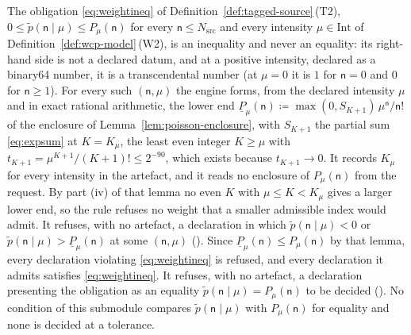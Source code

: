\begin{requirement}\label{req:sector-weight-bound}
The obligation \eqref{eq:weightineq} of Definition~\ref{def:tagged-source}\,(T2),
$0\le\tilde p(\mathsf{n}\mid\mu)\le P_\mu(\mathsf{n})$ for every
$\mathsf{n}\le N_{\mathrm{src}}$ and every intensity $\mu\in\mathrm{Int}$ of
Definition~\ref{def:wcp-model}\,(W2), is an inequality and never an equality:
its right-hand side is not a declared datum, and at a positive intensity,
declared as a binary64 number, it is a transcendental number (at $\mu=0$ it is
$1$ for $\mathsf{n}=0$ and $0$ for $\mathsf{n}\ge1$). For every such
$(\mathsf{n},\mu)$ the engine forms, from the declared intensity $\mu$ and in
exact rational arithmetic, the lower end
$\underline{P}_\mu(\mathsf{n})\coloneqq\max(0,S_{K+1})\,\mu^{\mathsf{n}}/\mathsf{n}!$
of the enclosure of Lemma~\ref{lem:poisson-enclosure}, with $S_{K+1}$ the
partial sum \eqref{eq:expsum} at $K=K_\mu$, the least even integer
$K\ge\mu$ with $t_{K+1}=\mu^{K+1}/(K+1)!\le2^{-90}$, which exists because
$t_{K+1}\to0$. It records $K_\mu$ for every intensity in the artefact, and it
reads no enclosure of $P_\mu(\mathsf{n})$ from the request. By part (iv) of
that lemma no even $K$ with $\mu\le K<K_\mu$ gives a larger lower end, so the
rule refuses no weight that a smaller admissible index would admit. It
refuses, with no artefact, a declaration in which
$\tilde p(\mathsf{n}\mid\mu)<0$ or
$\tilde p(\mathsf{n}\mid\mu)>\underline{P}_\mu(\mathsf{n})$ at some
$(\mathsf{n},\mu)$ (). Since
$\underline{P}_\mu(\mathsf{n})\le P_\mu(\mathsf{n})$ by that lemma, every
declaration violating \eqref{eq:weightineq} is refused, and every declaration
it admits satisfies \eqref{eq:weightineq}. It refuses, with no artefact, a
declaration presenting the obligation as an equality
$\tilde p(\mathsf{n}\mid\mu)=P_\mu(\mathsf{n})$ to be decided
(). No condition of this submodule compares
$\tilde p(\mathsf{n}\mid\mu)$ with $P_{\mu}(\mathsf{n})$ for equality and none
is decided at a tolerance.
\end{requirement}
